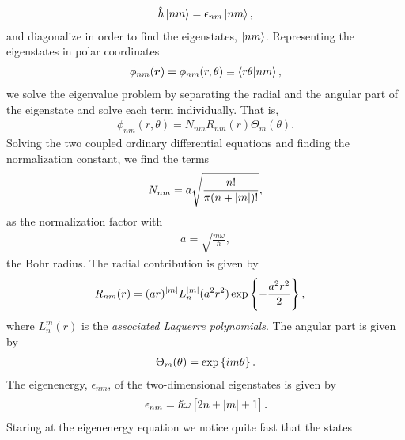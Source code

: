         \begin{align}
            \hat{h}\ket{nm} = \epsilon_{nm}\ket{nm},
        \end{align}
        and diagonalize in order to find the eigenstates, $\ket{nm}$.
        Representing the eigenstates in polar coordinates
        \begin{align}
            \phi_{nm}(\boldsymbol{r}) = \phi_{nm}(r, \theta)
            \equiv \braket{r\theta}{nm},
        \end{align}
        we solve the eigenvalue problem by separating the radial and the angular
        part of the eigenstate and solve each term individually. That is,
        \begin{align}
            \phi_{nm}(r, \theta) = N_{nm}R_{nm}(r)\Theta_{m}(\theta).
            \label{eq:spf-2dqd}
        \end{align}
        Solving the two coupled ordinary differential equations and finding the
        normalization constant, we find the terms
        \begin{align}
            N_{nm} = a\sqrt{\frac{n!}{\pi(n + \abs{m})!}},
        \end{align}
        as the normalization factor with
        \begin{align}
            a = \sqrt{\frac{m\omega}{\hslash}},
        \end{align}
        the Bohr radius. The radial contribution is given by
        \begin{align}
            R_{nm}(r)
            &= (ar)^{\abs{m}}L^{\abs{m}}_{n}(a^2r^2)
            \exp\left\{ -\frac{a^2 r^2}{2} \right\},
            \label{eq:radial-function-tdho}
        \end{align}
        where $L^{m}_{n}(r)$ is the \emph{associated Laguerre polynomials}. The
        angular part is given by
        \begin{align}
            \Theta_m(\theta) = \exp\left\{ im\theta \right\}.
        \end{align}
        The eigenenergy, $\epsilon_{nm}$, of the two-dimensional eigenstates is
        given by
        \begin{align}
            \epsilon_{nm} = \hslash\omega\left[ 
                2n + \abs{m} + 1
             \right].
            \label{eq:eigenenergies_2dqd}
        \end{align}
        Staring at the eigenenergy equation we notice quite fast that the states
